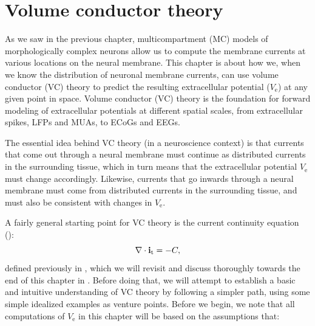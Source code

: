 \chapter{Volume conductor theory}
\label{chap:VC} %
As we saw in the previous chapter, multicompartment (MC) models of morphologically complex neurons 
allow us to compute the membrane currents at various locations on the neural membrane. 
This chapter is about how we, when we know the distribution of neuronal membrane currents, 
can use volume conductor (VC) theory to predict the resulting extracellular potential ($V_\mathrm{e}$) 
at any given point in space. Volume conductor (VC) theory is the foundation for forward modeling 
of extracellular potentials at different spatial scales, from extracellular spikes, 
LFPs and MUAs, to ECoGs and EEGs. 

The essential idea behind VC theory (in a neuroscience context) is that currents that come 
out through a neural membrane must continue as distributed currents in the surrounding tissue, 
which in turn means that the extracellular potential $V_\mathrm{e}$ 
must change accordingly. Likewise, currents that go inwards through a neural membrane must come 
from distributed currents in the surrounding tissue, and must also be consistent 
with changes in $V_\mathrm{e}$. 


A fairly general starting point for VC theory is the current continuity equation ():
\begin{equation}
{\bf \nabla} \cdot {\bf i}_\text{t} = -C,
\label{eq:VC:continuity1}
\end{equation}
defined previously in , which we will revisit and discuss thoroughly towards the end of this 
chapter in . Before doing that, we will attempt to establish a basic and intuitive 
understanding of VC theory by following a simpler path, using some simple idealized examples as venture points. 
Before we begin, we note that all computations of $V_\mathrm{e}$ in this chapter
will be based on the assumptions that:

